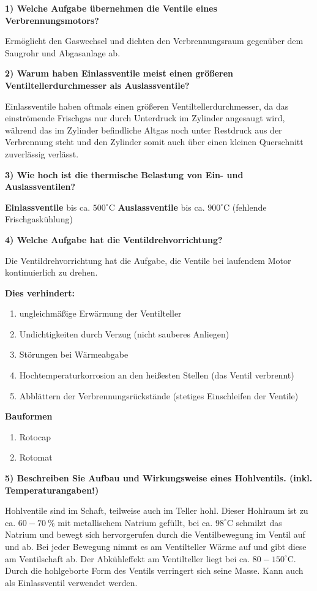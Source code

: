 \textbf{1) Welche Aufgabe übernehmen die Ventile eines
Verbrennungsmotors?}

Ermöglicht den Gaswechsel und dichten den Verbrennungsraum gegenüber dem
Saugrohr und Abgasanlage ab.

\textbf{2) Warum haben Einlassventile meist einen größeren
Ventiltellerdurchmesser als Auslassventile?}

Einlassventile haben oftmals einen größeren Ventiltellerdurchmesser, da
das einströmende Frischgas nur durch Unterdruck im Zylinder angesaugt
wird, während das im Zylinder befindliche Altgas noch unter Restdruck
aus der Verbrennung steht und den Zylinder somit auch über einen kleinen
Querschnitt zuverlässig verlässt.

\textbf{3) Wie hoch ist die thermische Belastung von Ein- und
Auslassventilen?}

\textbf{Einlassventile} bis ca. $500^\circ\text{C}$
\textbf{Auslassventile} bis ca. $900^\circ\text{C}$ (fehlende
Frischgaskühlung)

\textbf{4) Welche Aufgabe hat die Ventildrehvorrichtung?}

Die Ventildrehvorrichtung hat die Aufgabe, die Ventile bei laufendem
Motor kontinuierlich zu drehen.

\textbf{Dies verhindert:}

\begin{enumerate}
\item
  ungleichmäßige Erwärmung der Ventilteller
\item
  Undichtigkeiten durch Verzug (nicht sauberes Anliegen)
\item
  Störungen bei Wärmeabgabe
\item
  Hochtemperaturkorrosion an den heißesten Stellen (das Ventil
  verbrennt)
\item
  Abblättern der Verbrennungsrückstände (stetiges Einschleifen der
  Ventile)
\end{enumerate}

\textbf{Bauformen}

\begin{enumerate}
\item
  Rotocap
\item
  Rotomat
\end{enumerate}

\textbf{5) Beschreiben Sie Aufbau und Wirkungsweise eines Hohlventils.
(inkl. Temperaturangaben!)}

Hohlventile sind im Schaft, teilweise auch im Teller hohl. Dieser
Hohlraum ist zu ca. $60 - 70~\%$ mit metallischem Natrium gefüllt, bei
ca. $98^\circ\text{C}$ schmilzt das Natrium und bewegt sich
hervorgerufen durch die Ventilbewegung im Ventil auf und ab. Bei jeder
Bewegung nimmt es am Ventilteller Wärme auf und gibt diese am
Ventilschaft ab. Der Abkühleffekt am Ventilteller liegt bei ca.
$80 - 150^\circ\text{C}$. Durch die hohlgeborte Form des Ventils
verringert sich seine Masse. Kann auch als Einlassventil verwendet
werden.

